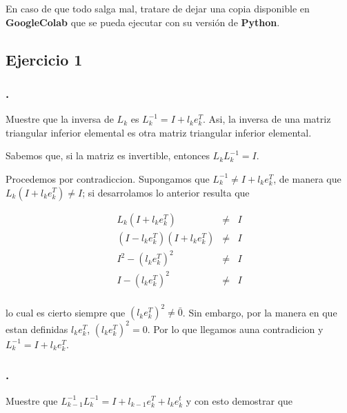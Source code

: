 \documentclass[11pt]{article}
\begin{document}
En caso de que todo salga mal, tratare de dejar una copia disponible en
\textbf{GoogleColab} que se pueda ejecutar con su versión de
\textbf{Python}.













\newpage
    \hypertarget{ejercicio-1}{%
\subsection{Ejercicio 1}\label{ejercicio-1}}

    \hypertarget{section}{%
\subsubsection{.}\label{section}}

Muestre que la inversa de \(L_k\) es \(L^{-1}_k = I + l_ke_k^T\). Asi,
la inversa de una matriz triangular inferior elemental es otra matriz
triangular inferior elemental.

    Sabemos que, si la matriz es invertible, entonces \(L_kL_k^{-1} = I\).

Procedemos por contradiccion. Supongamos que
\(L^{-1}_k \neq I + l_ke_k^T\), de manera que
\(L_k(I + l_ke_k^T) \neq I\); si desarrolamos lo anterior resulta que

\begin{eqnarray*}
    L_k(I + l_ke_k^T) &\neq& I \\
    (I - l_ke_k^T)(I + l_ke_k^T) &\neq& I \\
    I^2 - (l_ke_k^T)^2 &\neq& I \\
    I - (l_ke_k^T)^2 &\neq& I \\ 
\end{eqnarray*}

lo cual es cierto siempre que \((l_ke_k^T)^2 \neq \bar{0}\). Sin
embargo, por la manera en que estan definidas \(l_ke_k^T\),
\((l_ke_k^T)^2 = 0\). Por lo que llegamos auna contradicion y
\(L^{-1}_k = I + l_ke_k^T\).

    \hypertarget{section}{%
\subsubsection{.}\label{section}}

Muestre que \(L^{-1}_{k-1}L^{-1}_k = I + l_{k-1}e^T_k + l_ke^t_k\) y con
esto demostrar que
\end{document}
